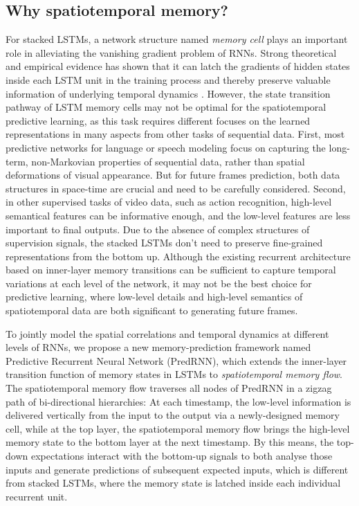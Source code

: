 \documentclass[10pt,journal,compsoc]{IEEEtran}
\begin{document}
\subsection{Why spatiotemporal memory?}

For stacked LSTMs, a network structure named \textit{memory cell} plays an important role in alleviating the vanishing gradient problem of RNNs. Strong theoretical and empirical evidence has shown that it can latch the gradients of hidden states inside each LSTM unit in the training process and thereby preserve valuable information of underlying temporal dynamics \cite{hochreiter1997long}.
However, the state transition pathway of LSTM memory cells may not be optimal for the spatiotemporal predictive learning, as this task requires different focuses on the learned representations in many aspects from other tasks of sequential data.
First, most predictive networks for language or speech modeling \cite{Sutskever2011Generating,Cho2014On,Graves2014Towards} focus on capturing the long-term, non-Markovian properties of sequential data, rather than spatial deformations of visual appearance. But for future frames prediction, both data structures in space-time are crucial and need to be carefully considered.
Second, in other supervised tasks of video data, such as action recognition, high-level semantical features can be informative enough, and the low-level features are less important to final outputs. Due to the absence of complex structures of supervision signals, the stacked LSTMs don't need to preserve fine-grained representations from the bottom up. 
Although the existing recurrent architecture based on inner-layer memory transitions can be sufficient to capture temporal variations at each level of the network, it may not be the best choice for predictive learning, where low-level details and high-level semantics of spatiotemporal data are both significant to generating future frames. 



To jointly model the spatial correlations and temporal dynamics at different levels of RNNs, we propose a new memory-prediction framework named Predictive Recurrent Neural Network (PredRNN), which extends the inner-layer transition function of memory states in LSTMs to \textit{spatiotemporal memory flow}.
The spatiotemporal memory flow traverses all nodes of PredRNN in a zigzag path of bi-directional hierarchies:
At each timestamp, the low-level information is delivered vertically from the input to the output via a newly-designed memory cell, while at the top layer, the spatiotemporal memory flow brings the high-level memory state to the bottom layer at the next timestamp.
By this means, the top-down expectations interact with the bottom-up signals to both analyse those inputs and generate predictions of subsequent expected inputs, which is different from stacked LSTMs, where the memory state is latched inside each individual recurrent unit.
\end{document}
